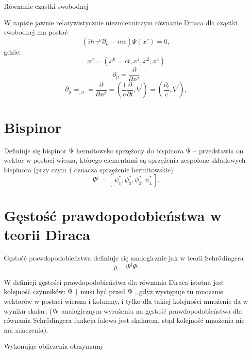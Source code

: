 \documentclass{article}
\begin{document}
Równanie cząstki swobodnej

W zapisie jawnie relatywistycznie niezmienniczym równanie Diraca dla cząstki swobodnej ma postać
$${ (i\hbar \,\gamma ^{\mu }\partial _{\mu }-mc)\Psi (x^{\nu })=0,}$$
gdzie:
$${ x^{\nu }=(x^{0}=ct,x^{1},x^{2},x^{3})}$$
$${ \partial _{\mu }={\frac {\partial }{\partial x^{\mu }}}}$$
$${ \partial _{\mu }=_{,\mu }={\frac {\partial }{\partial x^{\mu }}}=\left({\frac {1}{c}}{\frac {\partial }{\partial t}},{\vec {\nabla }}\right)=\left({\frac {\partial _{t}}{c}},{\vec {\nabla }}\right),}$$

\section{Bispinor}
Definiuje się bispinor Ψ  hermitowsko sprzężony do bispinora Ψ  – przedstawia on wektor w postaci wiesza, którego elementami są sprzężenia zespolone składowych bispinora (przy czym † oznacza sprzężenie hermitowskie) 
$${ \Psi ^{\dagger }=[\,\psi _{1}^{*},\psi _{2}^{*},\psi _{3}^{*},\psi _{4}^{*}\,].}$$

\section{Gęstość prawdopodobieństwa w teorii Diraca}
Gęstość prawdopodobieństwa definiuje się analogicznie jak w teorii Schrödingera 
$${ \rho =\Psi ^{\dagger }\Psi .}$$

W definicji gęstości prawdopodobieństwa dla równania Diraca istotna jest kolejność czynników: Ψ † musi być przed Ψ , gdyż występuje tu mnożenie wektorów w postaci wiersza i kolumny, i tylko dla takiej kolejności mnożenie da w wyniku skalar. (W analogicznym wyrażeniu na gęstość prawdopodobieństwa dla równania Schrödingera funkcja falowa jest skalarem, stąd kolejność mnożenia nie ma znaczenia).

Wykonując obliczenia otrzymamy 
\end{document}
